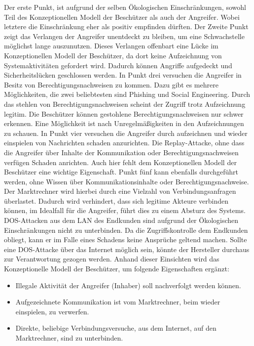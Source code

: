 \documentclass[11pt,a4paper]{report}
\begin{document}
Der erste Punkt, ist aufgrund der selben Ökologischen Einschränkungen, sowohl Teil des Konzeptionellen Modell der Beschützer als auch der Angreifer. Wobei letztere die Einschränkung eher als positiv empfinden dürften. Der Zweite Punkt zeigt das Verlangen der Angreifer unentdeckt zu bleiben, um eine Schwachstelle möglichst lange auszunutzen. Dieses Verlangen offenbart eine Lücke im Konzeptionellen Modell der Beschützer, da dort keine Aufzeichnung von Systemaktivitäten gefordert wird. Dadurch können Angriffe aufgedeckt und Sicherheitslücken geschlossen werden. In Punkt drei versuchen die Angreifer in Besitz von Berechtigungsnachweisen zu kommen. Dazu gibt es mehrere Möglichkeiten, die zwei beliebtesten sind Phishing und Social Engineering. Durch das stehlen von Berechtigungsnachweisen scheint der Zugriff trotz Aufzeichnung legitim. Die Beschützer können gestohlene Berechtigungsnachweisen nur schwer erkennen. Eine Möglichkeit ist nach Unregelmäßigkeiten in den Aufzeichnungen zu schauen. In Punkt vier versuchen die Angreifer durch aufzeichnen und wieder einspielen von Nachrichten schaden anzurichten. Die Replay-Attacke, ohne dass die Angreifer über Inhalte der Kommunikation oder Berechtigungsnachweisen verfügen Schaden anrichten. Auch hier fehlt dem Konzeptionellen Modell der Beschützer eine wichtige Eigenschaft. Punkt fünf kann ebenfalls durchgeführt werden, ohne Wissen über Kommunikationsinhalte oder Berechtigungsnachweise. Der Marktrechner wird hierbei durch eine Vielzahl von Verbindungsanfragen überlastet. Dadurch wird verhindert, dass sich legitime Akteure verbinden können, im Idealfall für die Angreifer, führt dies zu einem Absturz des Systems. DOS-Attacken aus dem LAN des Endkunden sind aufgrund der Ökologischen Einschränkungen nicht zu unterbinden. Da die Zugriffskontrolle dem Endkunden obliegt, kann er im Falle eines Schadens keine Ansprüche geltend machen. Sollte eine DOS-Attacke über das Internet möglich sein, könnte der Hersteller durchaus zur Verantwortung gezogen werden. Anhand dieser Einsichten wird das Konzeptionelle Modell der Beschützer, um folgende Eigenschaften ergänzt:

\begin{itemize}[leftmargin=*]
\item Illegale Aktivität der Angreifer (Inhaber) soll nachverfolgt werden können.
\item Aufgezeichnete Kommunikation ist vom Marktrechner, beim wieder einspielen, zu verwerfen.
\item Direkte, beliebige Verbindungsversuche, aus dem Internet, auf den Marktrechner, sind zu unterbinden.
\end{itemize}
\end{document}

